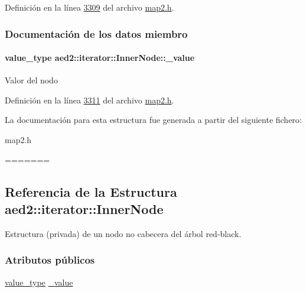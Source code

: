 \-Definición en la línea \hyperlink{map2_8h_source_l03309}{3309} del archivo \hyperlink{map2_8h_source}{map2.\-h}.



\subsubsection{\-Documentación de los datos miembro}
\hypertarget{structaed2_1_1iterator_1_1InnerNode_a3d80723a2dd1b746c0687f39fbc3d5e2_a3d80723a2dd1b746c0687f39fbc3d5e2}{
\paragraph[{\-\_\-value}]{\setlength{\rightskip}{0pt plus 5cm}value\-\_\-type {\bf aed2\-::iterator\-::\-Inner\-Node\-::\-\_\-value}}}\label{structaed2_1_1iterator_1_1InnerNode_a3d80723a2dd1b746c0687f39fbc3d5e2_a3d80723a2dd1b746c0687f39fbc3d5e2}
\-Valor del nodo 

\-Definición en la línea \hyperlink{map2_8h_source_l03311}{3311} del archivo \hyperlink{map2_8h_source}{map2.\-h}.



\-La documentación para esta estructura fue generada a partir del siguiente fichero\-:\begin{DoxyCompactItemize}
\item 
map2.\-h\end{DoxyCompactItemize}
=======
\hypertarget{structaed2_1_1iterator_1_1InnerNode}{}\subsection{Referencia de la Estructura aed2\+:\+:iterator\+:\+:Inner\+Node}
\label{structaed2_1_1iterator_1_1InnerNode}


Estructura (privada) de un nodo no cabecera del árbol red-\/black.  


\subsubsection*{Atributos públicos}
\begin{DoxyCompactItemize}
\item 
\hyperlink{classaed2_1_1iterator_a6411a2c08b2b7c52f063bef1a168acb6_a6411a2c08b2b7c52f063bef1a168acb6}{value\+\_\+type} \hyperlink{structaed2_1_1iterator_1_1InnerNode_a3d80723a2dd1b746c0687f39fbc3d5e2_a3d80723a2dd1b746c0687f39fbc3d5e2}{\+\_\+value}
\end{DoxyCompactItemize}
